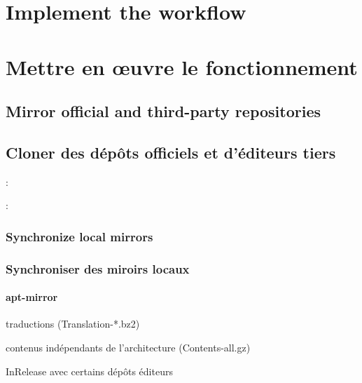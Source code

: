 \ml
{\section{Implement the workflow}}
{\section{Mettre en œuvre le fonctionnement}}

\ml
{\subsection{Mirror official and third-party repositories}}
{\subsection{Cloner des dépôts officiels et d’éditeurs tiers}}

:
\begin{itmz}
\item{\ml{\todo}
{\todo}}
\end{itmz}

:
\begin{itmz}
\item{\ml{\todo}
{\todo}}
\end{itmz}

\ml
{\subsubsection{Synchronize local mirrors}}
{\subsubsection{Synchroniser des miroirs locaux}}

\paragraph{apt-mirror}

\begin{itmz}
\item{
{traductions} (Translation-*.bz2)}
\item{
{contenus indépendants de l’architecture} (Contents-all.gz)}
\item{InRelease 
{avec certains dépôts éditeurs}}
\end{itmz}

